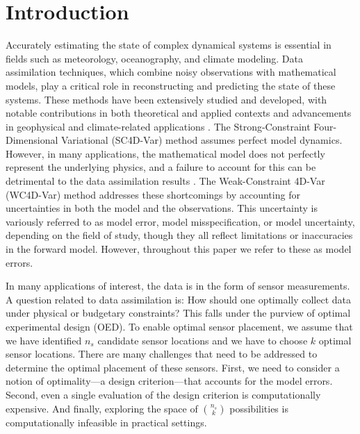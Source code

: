 \documentclass{aims} %
\theoremstyle{definition}
\begin{document}

\section{Introduction}

Accurately estimating the state of complex dynamical systems is essential in fields such as meteorology, oceanography, and climate modeling. Data assimilation techniques, which combine noisy observations with mathematical models, play a critical role in reconstructing and predicting the state of these systems. These methods have been extensively studied and developed, with notable contributions in both theoretical and applied contexts and advancements in geophysical and climate-related applications \cite{1994Evensen, Freitag,GHIL1991141, Gratton, Xiang-Yu}. The Strong-Constraint Four-Dimensional Variational (SC4D-Var) method assumes perfect model dynamics. 
%
However, in many applications, the mathematical model does not perfectly represent the underlying physics, and a failure to account for this can be detrimental to the data assimilation results \cite{ngodock2017weak}.
%
The Weak-Constraint 4D-Var (WC4D-Var) method \cite{ Laloyaux,Tremolet, xu2007}   addresses these shortcomings by accounting for uncertainties in both the model and the observations.  This uncertainty is variously referred to as model error, model misspecification, or model uncertainty, depending on the field of study, though they all reflect  limitations or inaccuracies in the forward model. However, throughout this paper we refer to these as model errors.


In many applications of interest, the data is in the form of sensor measurements. A question related to data assimilation is: How should one optimally collect data under physical or budgetary constraints? This falls under the purview of optimal experimental design (OED). 
To enable optimal sensor placement, we assume that we have identified $n_s$ candidate sensor locations  and we have to choose $k$ optimal sensor locations. There are many challenges that need to be addressed to determine the optimal placement of these sensors.
 First, we need to consider a notion of optimality---a design criterion---that accounts for the model errors. 
Second, even a single evaluation of the design criterion is computationally expensive. And finally, exploring the space of  
$\binom{n_s}{k}$
possibilities  is computationally infeasible in practical settings.  
\end{document}
